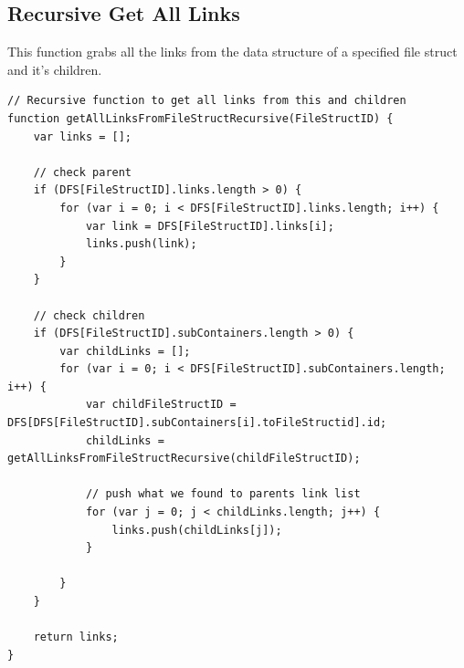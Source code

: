\documentclass[letterpaper,10pt,titlepage,draftclsnofoot,onecolumn,onesided] {IEEEtran}
\begin{document}
	\pagebreak
	\subsection{Recursive Get All Links}
	This function grabs all the links from the data structure of a specified file struct and it's children.
	\begin{lstlisting}
// Recursive function to get all links from this and children
function getAllLinksFromFileStructRecursive(FileStructID) {
    var links = [];

    // check parent
    if (DFS[FileStructID].links.length > 0) {
        for (var i = 0; i < DFS[FileStructID].links.length; i++) {
            var link = DFS[FileStructID].links[i];
            links.push(link);
        }
    }

    // check children
    if (DFS[FileStructID].subContainers.length > 0) {
        var childLinks = [];
        for (var i = 0; i < DFS[FileStructID].subContainers.length; i++) {
            var childFileStructID = DFS[DFS[FileStructID].subContainers[i].toFileStructid].id;
            childLinks = getAllLinksFromFileStructRecursive(childFileStructID);

            // push what we found to parents link list
            for (var j = 0; j < childLinks.length; j++) {
                links.push(childLinks[j]);
            }

        }
    } 

    return links;
}
	\end{lstlisting}

\pagebreak


\end{document}
